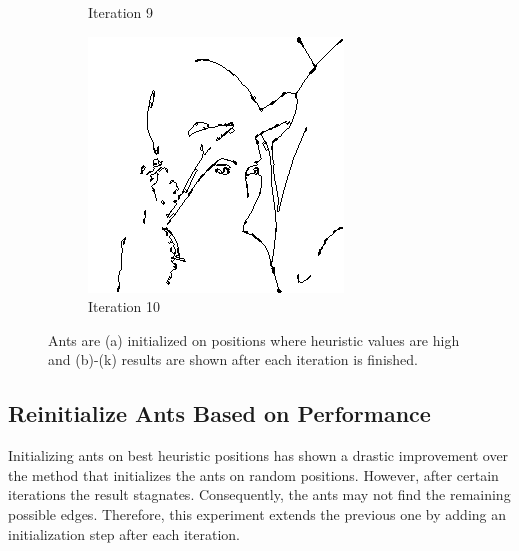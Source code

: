 \documentclass{llncs}
\begin{document}
\begin{figure}
\begin{subfigure}[b]{0.3\textwidth}
                \caption{Iteration 9}
                \label{fig:heu_iter9}
        \end{subfigure}
        \quad
        \begin{subfigure}[b]{0.3\textwidth}
                \includegraphics[width=\textwidth]{IMG/HeuristicInit/Iteration10}
                \caption{Iteration 10}
                \label{fig:heu_iter10}
        \end{subfigure}
        \caption{Ants are (a) initialized on positions where heuristic values are high and (b)-(k) results are shown after each iteration is finished.}\label{fig:heuristic_approach}
	\end{figure}

	\subsection{Reinitialize Ants Based on Performance}\label{subsec:improve_search}
	Initializing ants on best heuristic positions has shown a drastic improvement over the method that initializes the ants on random positions. However, after certain iterations the result stagnates. Consequently, the ants may not find the remaining possible edges. Therefore, this experiment extends the previous one by adding an initialization step after each iteration. 
	
\end{document}
